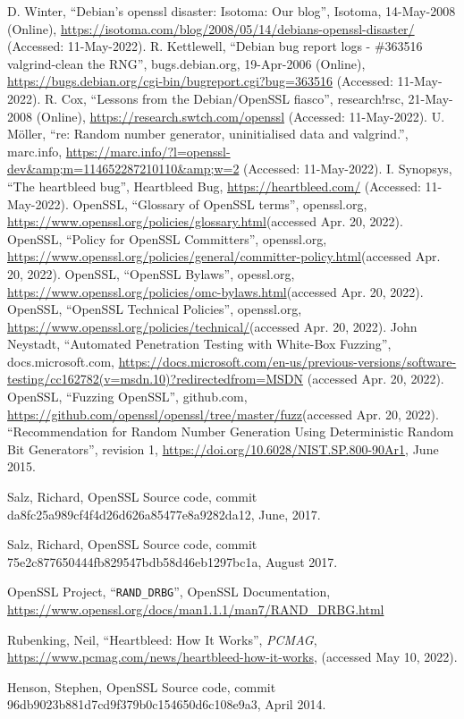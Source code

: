 \documentclass[conference]{IEEEtran}
\begin{document}
\begin{thebibliography}{00}
 D. Winter, ``Debian's openssl disaster: Isotoma: Our blog'', Isotoma, 14-May-2008 (Online), 
  \url{https://isotoma.com/blog/2008/05/14/debians-openssl-disaster/} (Accessed: 11-May-2022). 
 R. Kettlewell, ``Debian bug report logs - \#363516 valgrind-clean the RNG'', bugs.debian.org, 19-Apr-2006 (Online), 
  \url{https://bugs.debian.org/cgi-bin/bugreport.cgi?bug=363516} (Accessed: 11-May-2022). 
 R. Cox, ``Lessons from the Debian/OpenSSL fiasco'', research!rsc, 21-May-2008 (Online), 
  \url{https://research.swtch.com/openssl} (Accessed: 11-May-2022). 
 U. Möller, ``re: Random number generator, uninitialised data and valgrind.'', marc.info, 
  \url{https://marc.info/?l=openssl-dev&amp;m=114652287210110&amp;w=2} (Accessed: 11-May-2022). 
 I. Synopsys, ``The heartbleed bug'', Heartbleed Bug,
  \url{https://heartbleed.com/} (Accessed: 11-May-2022). 
 OpenSSL, ``Glossary of OpenSSL terms'', openssl.org,
  \url{https://www.openssl.org/policies/glossary.html}(accessed Apr. 20, 2022).
 OpenSSL, ``Policy for OpenSSL Committers'', openssl.org,
  \url{https://www.openssl.org/policies/general/committer-policy.html}(accessed Apr. 20, 2022).
 OpenSSL, ``OpenSSL Bylaws'', opessl.org, 
  \url{https://www.openssl.org/policies/omc-bylaws.html}(accessed Apr. 20, 2022).
 OpenSSL, ``OpenSSL Technical Policies'', openssl.org,
  \url{https://www.openssl.org/policies/technical/}(accessed Apr. 20, 2022).
 John Neystadt, ``Automated Penetration Testing with White-Box Fuzzing'', docs.microsoft.com,
  \url{https://docs.microsoft.com/en-us/previous-versions/software-testing/cc162782(v=msdn.10)?redirectedfrom=MSDN}
  (accessed Apr. 20, 2022).
 OpenSSL, ``Fuzzing OpenSSL'', github.com,
  \url{https://github.com/openssl/openssl/tree/master/fuzz}(accessed Apr. 20, 2022).
 ``Recommendation for Random Number Generation Using
  Deterministic Random Bit Generators'', revision 1,
  \url{https://doi.org/10.6028/NIST.SP.800-90Ar1}, June 2015.

 Salz, Richard, OpenSSL Source code, commit da8fc25a989cf4f4d26d626a85477e8a9282da12, June, 2017.

 Salz, Richard, OpenSSL Source code, commit 75e2c877650444fb829547bdb58d46eb1297bc1a, August 2017.

 OpenSSL Project, ``\verb|RAND_DRBG|'', OpenSSL
  Documentation,
  \url{https://www.openssl.org/docs/man1.1.1/man7/RAND_DRBG.html}

 Rubenking, Neil, ``Heartbleed: How It Works'', \emph{PCMAG}, \url{https://www.pcmag.com/news/heartbleed-how-it-works}, (accessed May 10, 2022).

 Henson, Stephen, OpenSSL Source code, commit 96db9023b881d7cd9f379b0c154650d6c108e9a3, April 2014.

\end{thebibliography}
\end{document}
